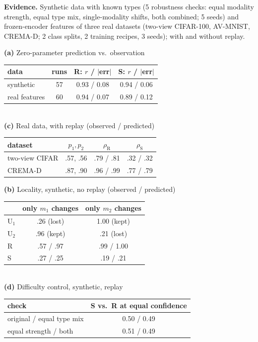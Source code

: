 \documentclass[10pt]{article}
\begin{document}
\textbf{Evidence.} Synthetic data with known types (5 robustness checks: equal modality strength, equal type mix,
single-modality shifts, both combined; 5 seeds) and frozen-encoder features of three real datasets (two-view CIFAR-100,
AV-MNIST, CREMA-D; 2 class splits, 2 training recipes, 3 seeds); with and without replay.

\begin{minipage}[t]{0.49\linewidth}
\small\centering
\textbf{(a)} Zero-parameter prediction vs.\ observation\\[2pt]
\begin{tabular}{lccc}
\toprule
data & runs & R: $r$ / $|$err$|$ & S: $r$ / $|$err$|$\\
\midrule
synthetic & 57 & 0.93 / 0.08 & 0.94 / 0.06\\
real features & 60 & 0.94 / 0.07 & 0.89 / 0.12\\
\bottomrule
\end{tabular}\\[5pt]
\textbf{(c)} Real data, with replay (observed / predicted)\\[2pt]
\begin{tabular}{lccc}
\toprule
dataset & $p_1,p_2$ & $\rho_{\text{R}}$ & $\rho_{\text{S}}$\\
\midrule
two-view CIFAR & .57, .56 & .79 / .81 & .32 / .32\\
CREMA-D & .87, .90 & .96 / .99 & .77 / .79\\
\bottomrule
\end{tabular}
\end{minipage}\hfill
\begin{minipage}[t]{0.49\linewidth}
\small\centering
\textbf{(b)} Locality, synthetic, no replay (observed / predicted)\\[2pt]
\begin{tabular}{lcc}
\toprule
 & only $m_1$ changes & only $m_2$ changes\\
\midrule
U$_1$ & .26 (lost) & 1.00 (kept)\\
U$_2$ & .96 (kept) & .21 (lost)\\
R & .57 / .97 & .99 / 1.00\\
S & .27 / .25 & .19 / .21\\
\bottomrule
\end{tabular}\\[5pt]
\textbf{(d)} Difficulty control, synthetic, replay\\[2pt]
\begin{tabular}{lc}
\toprule
check & S vs.\ R at equal confidence\\
\midrule
original / equal type mix & 0.50 / 0.49\\
equal strength / both & 0.51 / 0.49\\
\bottomrule
\end{tabular}
\end{minipage}
\end{document}
